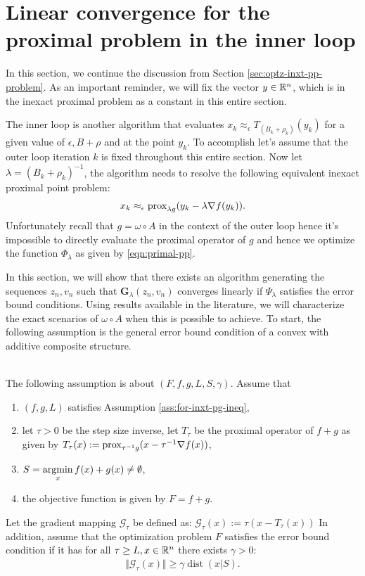 \documentclass[12pt]{article}
\DeclareMathOperator{\dist}{\mathop{dist}}
\begin{document}
\section{Linear convergence for the proximal problem in the inner loop}
    In this section, we continue the discussion from Section \ref{sec:optz-inxt-pp-problem}. 
    As an important reminder, we will fix the vector $y \in \mathbb R^n$, which is in the inexact proximal problem as a constant in this entire section. 
    \par
    The inner loop is another algorithm that evaluates $x_k \approx_\epsilon T_{(B_k + \rho_k)}(y_k)$ for a given value of $\epsilon, B + \rho$ and at the point $y_k$. 
    To accomplish let's assume that the outer loop iteration $k$ is fixed throughout this entire section.
    Now let $\lambda = (B_k + \rho_k)^{-1}$, the algorithm needs to resolve the following equivalent inexact proximal point problem: 
    \begin{align*}
        x_k \approx_\epsilon \operatorname{prox}_{\lambda g}(y_k - \lambda \nabla f(y_k)). 
    \end{align*}
    Unfortunately recall that $g = \omega \circ A$ in the context of the outer loop hence it's impossible to directly evaluate the proximal operator of $g$ and hence we optimize the function $\Phi_\lambda$ as given by \eqref{eqn:primal-pp}. 
    \par
    In this section, we will show that there exists an algorithm generating the sequences $z_n, v_n$ such that $\mathbf G_\lambda (z_n, v_n)$ converges linearly if $\Psi_\lambda$ satisfies the error bound conditions. 
    Using results available in the literature, we will characterize the exact scenarios of $\omega \circ A$ when this is possible to achieve. 
    To start, the following assumption is the general error bound condition of a convex with additive composite structure. 
    \begin{assumption}\;\label{ass:pg-eb}\\
        The following assumption is about $(F, f, g, L, S, \gamma)$. 
        Assume that
        \begin{enumerate}[nosep]
            \item $(f, g, L)$ satisfies Assumption \ref{ass:for-inxt-pg-ineq}, 
            \item let $\tau > 0$ be the step size inverse, let $T_{\tau}$ be the proximal operator of $f + g$ as given by $T_{\tau}(x) := \operatorname{prox}_{\tau^{-1}g}(x - \tau^{-1}\nabla f(x))$, 
            \item $S= \mathop{\rm argmin}\limits_{x}{f(x) + g(x)} \neq \emptyset$, 
            \item the objective function is given by $F = f + g$. 
        \end{enumerate}   
        Let the gradient mapping $\mathcal G_{\tau}$ be defined as: $\mathcal G_\tau(x) := \tau (x - T_\tau(x))$     
        In addition, assume that the optimization problem $F$ satisfies the error bound condition if it has for all $\tau \ge L, x \in \mathbb R^n$ there exists $\gamma > 0$: 
        \begin{align}\label{ineq:pg-eb}
            \Vert \mathcal G_\tau(x)\Vert \ge \gamma\dist(x|S). 
        \end{align}
    \end{assumption}
\end{document}
